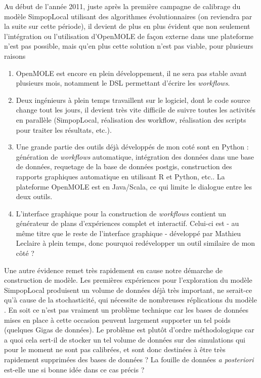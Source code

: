 Au début de l'année 2011, juste après la première campagne de calibrage du modèle SimpopLocal utilisant des algorithmes évolutionnaires (on reviendra par la suite sur cette période), il devient de plus en plus évident que non seulement l'intégration ou l'utilisation d'OpenMOLE de façon externe dans une plateforme n'est pas possible, mais qu'en plus cette solution n'est pas viable, pour plusieurs raisons

\begin{enumerate}[label=(\alph*),labelindent=\parindent,leftmargin=*]
\item OpenMOLE est encore en plein développement, il ne sera pas stable avant plusieurs mois, notamment le DSL permettant d'écrire les \textit{workflows}.
\item Deux ingénieurs à plein temps travaillent sur le logiciel, dont le code source change tout les jours, il devient très vite difficile de suivre toutes les activités en parallèle (SimpopLocal, réalisation des workflow, réalisation des scripts pour traiter les résultats, etc.).
\item Une grande partie des outils déjà développés de mon coté sont en Python : génération de \textit{workflows} automatique, intégration des données dans une base de données, requetage de la base de données postgis, construction des rapports graphiques automatique en utilisant R et Python, etc.. La plateforme OpenMOLE est en Java/Scala, ce qui limite le dialogue entre les deux outils.
\item L'interface graphique pour la construction de \textit{workflows} contient un générateur de plans d'expériences complet et interactif. Celui-ci est - au même titre que le reste de l'interface graphique - développé par Mathieu Leclaire à plein temps, donc pourquoi redévelopper un outil similaire de mon côté ?
\end{enumerate}

Une autre évidence remet très rapidement en cause notre démarche de construction de modèle. Les premières expériences pour l'exploration du modèle SimpopLocal produisent un volume de données déjà très important, ne serait-ce qu'à cause de la stochasticité, qui nécessite de nombreuses réplications du modèle . En soit ce n'est pas vraiment un problème technique car les bases de données mises en place à cette occasion peuvent largement supporter un tel poids (quelques Gigas de données). Le problème est plutôt d'ordre méthodologique car a quoi cela sert-il de stocker un tel volume de données sur des simulations qui pour le moment ne sont pas calibrées, et sont donc destinées à être très rapidement supprimées des bases de données ? La fouille de données \textit{a posteriori} est-elle une si bonne idée dans ce cas précis ?

